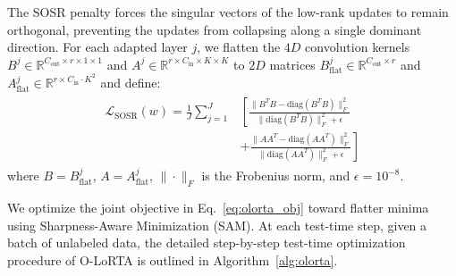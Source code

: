 \documentclass{article}
\theoremstyle{plain}
\theoremstyle{definition}
\theoremstyle{remark}
\begin{document}
The SOSR penalty \cite{yu2024dare} forces the singular vectors of the low-rank updates to remain orthogonal, preventing the updates from collapsing along a single dominant direction. For each adapted layer $j$, we flatten the $4D$ convolution kernels $B^j \in \mathbb{R}^{C_{\text{out}} \times r \times 1 \times 1}$ and $A^j \in \mathbb{R}^{r \times C_{\text{in}} \times K \times K}$ to $2D$ matrices $B_{\text{flat}}^j \in \mathbb{R}^{C_{\text{out}} \times r}$ and $A_{\text{flat}}^j \in \mathbb{R}^{r \times C_{\text{in}} \cdot K^2}$ and define:
\begin{align}
    \begin{aligned}
        \mathcal{L}_{\text{SOSR}}(w) = \frac{1}{J} \sum_{j=1}^J &\left[ \frac{\| B^T B - \text{diag}(B^T B) \|_F^2}{\| \text{diag}(B^T B) \|_F^2 + \epsilon} \right. \\
        &\left. + \frac{\| A A^T - \text{diag}(A A^T) \|_F^2}{\| \text{diag}(A A^T) \|_F^2 + \epsilon} \right]
    \end{aligned}
\end{align}
where $B = B_{\text{flat}}^j$, $A = A_{\text{flat}}^j$, $\|\cdot\|_F$ is the Frobenius norm, and $\epsilon = 10^{-8}$.

We optimize the joint objective in Eq.~\ref{eq:olorta_obj} toward flatter minima using Sharpness-Aware Minimization (SAM). At each test-time step, given a batch of unlabeled data, the detailed step-by-step test-time optimization procedure of O-LoRTA is outlined in Algorithm~\ref{alg:olorta}.
\end{document}

